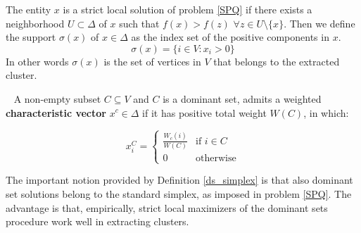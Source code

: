 The entity $x$ is a strict local solution of problem \ref{SPQ} if there exists a neighborhood $U \subset	\Delta$ of $x$ such that $f(x) > f(z)$ $\forall z \in U\setminus\{x\}$. Then we define the support $\sigma(x)$ of $x\in\Delta$ as the index set of the positive components in $x$.
$$\sigma(x) = \{i\in V: x_i > 0\}$$
In other words $\sigma(x)$ is the set of vertices in $V$ that belongs to the extracted cluster.

\begin{defn}{}~\label{ds_simplex} A non-empty subset $C \subseteq V$ and $C$ is a dominant set, admits a weighted \textbf{characteristic vector} $x^c\in \Delta$ if it has positive total weight $W(C)$, in which:

$$
x_i^C= \begin{cases}
\frac{W_c(i)}{W(C)} & \text{if } i\in C\\
0 & \text{otherwise}
\end{cases}
$$
\end{defn}
The important notion provided by Definition \ref{ds_simplex} is that also dominant set solutions belong to the standard simplex, as imposed in problem \ref{SPQ}. The advantage is that, empirically, strict local maximizers of the dominant sets procedure work well in extracting clusters.


